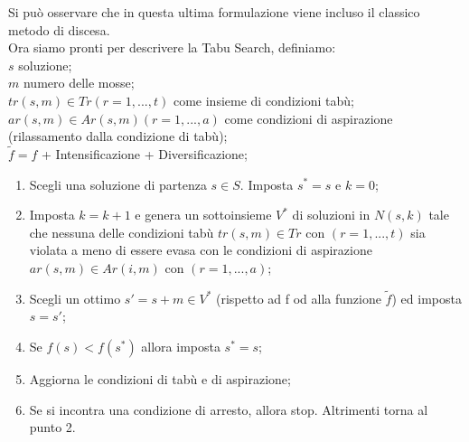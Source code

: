 Si può osservare che in questa ultima formulazione viene incluso il classico metodo di discesa.\\
Ora siamo pronti per descrivere la Tabu Search, definiamo:\\
$s$ soluzione;\\
$m$ numero delle mosse;\\
$tr(s,m) \in Tr (r=1,...,t)$ come insieme di condizioni tabù;\\
$ar(s,m) \in Ar(s,m) (r=1,...,a)$ come condizioni di aspirazione (rilassamento dalla condizione di tabù);\\
$\widetilde{f} = f$ + Intensificazione + Diversificazione;

\begin{enumerate}
\item Scegli una soluzione di partenza $s \in S$. Imposta $s^*=s$ e $k=0$;
\item Imposta $k=k+1$ e genera un sottoinsieme $V^*$ di soluzioni in $N(s,k)$ tale che nessuna delle condizioni tabù $tr(s,m) \in Tr$ con $(r=1,...,t)$ sia violata a meno di essere evasa con le condizioni di aspirazione $ar(s,m) \in Ar(i,m)$ con $(r=1,...,a)$;
\item Scegli un ottimo $s'=s+m \in V^*$ (rispetto ad f od alla funzione $\widetilde{f}$) ed imposta $s=s'$;
\item Se $f(s) < f(s^*)$ allora imposta $s^*=s$;
\item Aggiorna le condizioni di tabù e di aspirazione;
\item Se si incontra una condizione di arresto, allora stop. Altrimenti torna al punto 2.
\end{enumerate}


